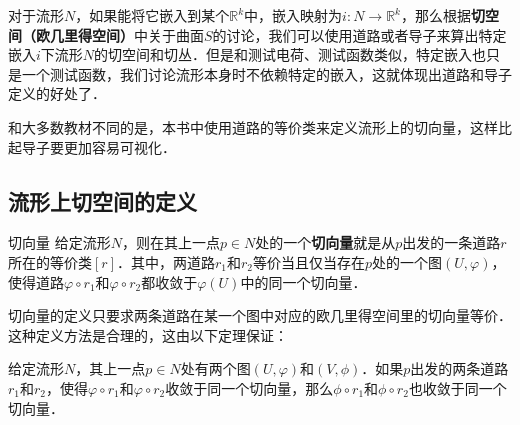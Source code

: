 
对于流形$N$，如果能将它嵌入到某个$\mathbb{R}^k$中，嵌入映射为$i:N\rightarrow\mathbb{R}^k$，那么根据\textbf{切空间（欧几里得空间）}中关于曲面$S$的讨论，我们可以使用道路或者导子来算出特定嵌入$i$下流形$N$的切空间和切丛．但是和测试电荷、测试函数类似，特定嵌入也只是一个测试函数，我们讨论流形本身时不依赖特定的嵌入，这就体现出道路和导子定义的好处了．

和大多数教材不同的是，本书中使用道路的等价类来定义流形上的切向量，这样比起导子要更加容易可视化．

\subsection{流形上切空间的定义}

\begin{definition}{切向量}
给定流形$N$，则在其上一点$p\in N$处的一个\textbf{切向量}就是从$p$出发的一条道路$r$所在的等价类$[r]$．其中，两道路$r_1$和$r_2$等价当且仅当存在$p$处的一个图$(U, \varphi)$，使得道路$\varphi\circ r_1$和$\varphi\circ r_2$都收敛于$\varphi(U)$中的同一个切向量．
\end{definition}

切向量的定义只要求两条道路在某一个图中对应的欧几里得空间里的切向量等价．这种定义方法是合理的，这由以下定理保证：

\begin{theorem}{}
给定流形$N$，其上一点$p\in N$处有两个图$(U, \varphi)$和$(V, \phi)$．如果$p$出发的两条道路$r_1$和$r_2$，使得$\varphi\circ r_1$和$\varphi\circ r_2$收敛于同一个切向量，那么$\phi\circ r_1$和$\phi\circ r_2$也收敛于同一个切向量．
\end{theorem}




